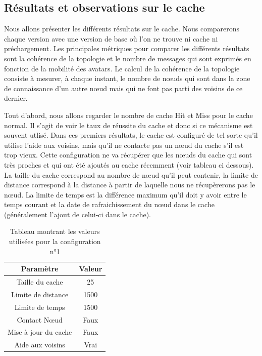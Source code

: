 \subsection{Résultats et observations sur le cache}
\label{resObsCache}

Nous allons présenter les différents résultats sur le cache. Nous comparerons chaque version avec une version de base où l'on ne trouve ni cache ni préchargement.
Les principales métriques pour comparer les différents résultats sont la cohérence de la topologie et le nombre de messages qui sont exprimés en fonction de la mobilité des avatars. Le calcul de la cohérence de la topologie consiste à mesurer, à chaque instant, le nombre de nœuds qui sont dans la zone de connaissance d'un autre nœud mais qui ne font pas parti des voisins de ce dernier.

\par Tout d'abord, nous allons regarder le nombre de cache Hit et Miss pour le cache normal. Il s'agit de voir le taux de réussite du cache et donc si ce mécanisme est souvent utlisé. Dans ces premiers résultats, le cache est configuré de tel sorte qu'il utilise l'aide aux voisins, mais qu'il ne contacte pas un nœud du cache s'il est trop vieux. Cette configuration ne va récupérer que les nœuds du cache qui sont très proches et qui ont été ajoutés au cache récemment (voir tableau ci dessous). La taille du cache correspond au nombre de nœud qu'il peut contenir, la limite de distance correspond à la distance à partir de laquelle nous ne récupèrerons pas le nœud. La limite de temps est la différence maximum qu'il doit y avoir entre le temps courant et la date de rafraichissement du nœud dans le cache (généralement l'ajout de celui-ci dans le cache). 
\begin{table}[!h]
  \begin{center}
    \begin{tabular}{|c|c|}
      \hline
      Paramètre & Valeur\\
      \hline
      Taille du cache & 25\\
      Limite de distance &  1500\\
      Limite de temps & 1500\\
      Contact Nœud & Faux\\
      Mise à jour du cache & Faux\\
      Aide aux voisins & Vrai\\
      \hline
    \end{tabular}
  \end{center}
  \label{tab:config1}
  \caption{Tableau montrant les valeurs utilisées pour la configuration n°1}
\end{table}


